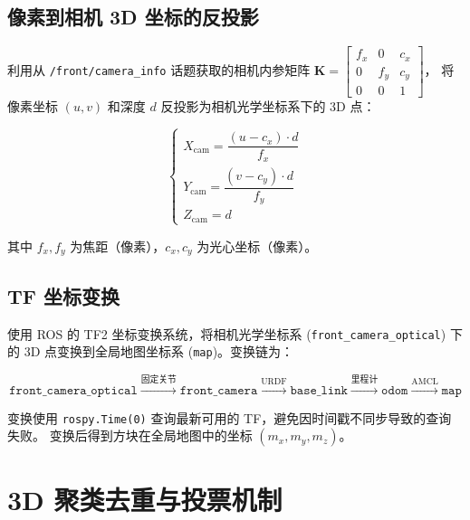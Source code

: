 \documentclass[12pt,a4paper]{article}
\begin{document}
\subsection{像素到相机 3D 坐标的反投影}

利用从 \texttt{/front/camera\_info} 话题获取的相机内参矩阵
$\mathbf{K} = \begin{bmatrix} f_x & 0 & c_x \\ 0 & f_y & c_y \\ 0 & 0 & 1 \end{bmatrix}$，
将像素坐标 $(u, v)$ 和深度 $d$ 反投影为相机光学坐标系下的 3D 点：

\begin{equation}
  \begin{cases}
    X_{\text{cam}} = \dfrac{(u - c_x) \cdot d}{f_x} \\[8pt]
    Y_{\text{cam}} = \dfrac{(v - c_y) \cdot d}{f_y} \\[8pt]
    Z_{\text{cam}} = d
  \end{cases}
  \label{eq:backproject}
\end{equation}

其中 $f_x, f_y$ 为焦距（像素），$c_x, c_y$ 为光心坐标（像素）。

\subsection{TF 坐标变换}

使用 ROS 的 TF2 坐标变换系统，将相机光学坐标系 (\texttt{front\_camera\_optical}) 下的
3D 点变换到全局地图坐标系 (\texttt{map})。变换链为：

\begin{equation}
  \texttt{front\_camera\_optical}
  \xrightarrow{\text{固定关节}}
  \texttt{front\_camera}
  \xrightarrow{\text{URDF}}
  \texttt{base\_link}
  \xrightarrow{\text{里程计}}
  \texttt{odom}
  \xrightarrow{\text{AMCL}}
  \texttt{map}
  \label{eq:tf_chain}
\end{equation}

变换使用 \texttt{rospy.Time(0)} 查询最新可用的 TF，避免因时间戳不同步导致的查询失败。
变换后得到方块在全局地图中的坐标 $(m_x, m_y, m_z)$。

\section{3D 聚类去重与投票机制}
\label{sec:dedup}
\end{document}
